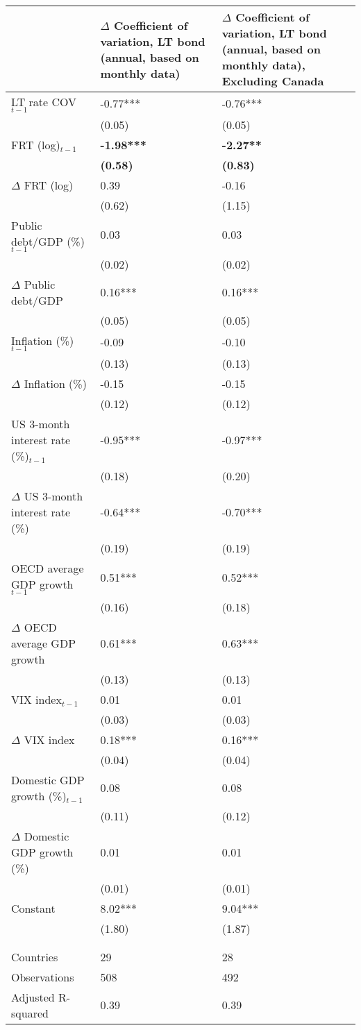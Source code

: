 {\tiny
\begin{tabular}{lp{3cm}p{3cm}}
  \hline
 & $\Delta$ Coefficient of variation, LT bond (annual, based on monthly data) & $\Delta$ Coefficient of variation, LT bond (annual, based on monthly data), \textbf{Excluding Canada} \\ 
  \hline
LT rate COV$_{t-1}$ & -0.77*** & -0.76*** \\ 
   & (0.05) & (0.05) \\ 
  FRT (log)$_{t-1}$ & \textbf{-1.98***} & \textbf{-2.27**} \\ 
   & \textbf{(0.58)} & \textbf{(0.83)} \\ 
  $\Delta$ FRT (log) & 0.39 & -0.16 \\ 
   & (0.62) & (1.15) \\ 
  Public debt/GDP (\%)$_{t-1}$ & 0.03 & 0.03 \\ 
   & (0.02) & (0.02) \\ 
  $\Delta$ Public debt/GDP & 0.16*** & 0.16*** \\ 
   & (0.05) & (0.05) \\ 
  Inflation (\%) $_{t-1}$ & -0.09 & -0.10 \\ 
   & (0.13) & (0.13) \\ 
  $\Delta$ Inflation (\%) & -0.15 & -0.15 \\ 
   & (0.12) & (0.12) \\ 
  US 3-month interest rate (\%)$_{t-1}$ & -0.95*** & -0.97*** \\ 
   & (0.18) & (0.20) \\ 
  $\Delta$ US 3-month interest rate (\%) & -0.64*** & -0.70*** \\ 
   & (0.19) & (0.19) \\ 
  OECD average GDP growth$_{t-1}$ & 0.51*** & 0.52*** \\ 
   & (0.16) & (0.18) \\ 
  $\Delta$ OECD average GDP growth & 0.61*** & 0.63*** \\ 
   & (0.13) & (0.13) \\ 
  VIX index$_{t-1}$ & 0.01 & 0.01 \\ 
   & (0.03) & (0.03) \\ 
  $\Delta$ VIX index & 0.18*** & 0.16*** \\ 
   & (0.04) & (0.04) \\ 
  Domestic GDP growth (\%)$_{t-1}$ & 0.08 & 0.08 \\ 
   & (0.11) & (0.12) \\ 
  $\Delta$ Domestic GDP growth (\%) & 0.01 & 0.01 \\ 
   & (0.01) & (0.01) \\ 
  Constant & 8.02*** & 9.04*** \\ 
   & (1.80) & (1.87) \\ 
   &  &  \\ 
   &  &  \\ 
  Countries & 29 & 28 \\ 
  Observations & 508 & 492 \\ 
  Adjusted R-squared & 0.39 & 0.39 \\ 
   \hline
\end{tabular}
}
